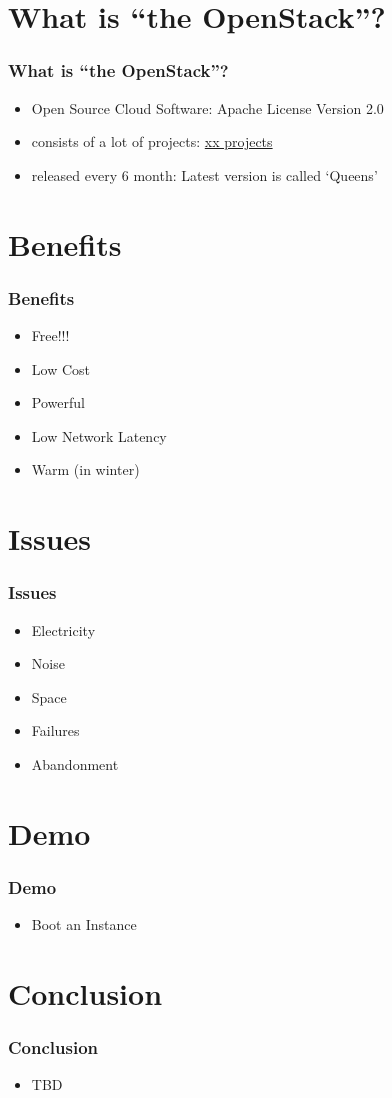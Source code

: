 \documentclass[aspectratio=169,11pt,hyperref={colorlinks=true}]{beamer}
\begin{document}
\section{What is ``the OpenStack''?}
\begin{frame}
  \frametitle{What is ``the OpenStack''?}
  \begin{itemize}
    \item Open Source Cloud Software: Apache License Version 2.0
    \item consists of a lot of projects: \href{http://governance.openstack.org/reference/projects/index.html}{xx projects}
    \item released every 6 month: Latest version is called `Queens'
  \end{itemize}
\end{frame}

\section{Benefits}
\begin{frame}
  \frametitle{Benefits}
  \begin{itemize}
    \item Free!!!
    \item Low Cost
    \item Powerful
    \item Low Network Latency
    \item Warm (in winter)
  \end{itemize}
\end{frame}

\section{Issues}
\begin{frame}
  \frametitle{Issues}
  \begin{itemize}
    \item Electricity
    \item Noise
    \item Space
    \item Failures
    \item Abandonment
  \end{itemize}
\end{frame}

\section{Demo}
\begin{frame}
  \frametitle{Demo}
  \begin{itemize}
    \item Boot an Instance
  \end{itemize}
\end{frame}

\section{Conclusion}
\begin{frame}
  \frametitle{Conclusion}
  \begin{itemize}
    \item TBD
  \end{itemize}
\end{frame}
\end{document}

